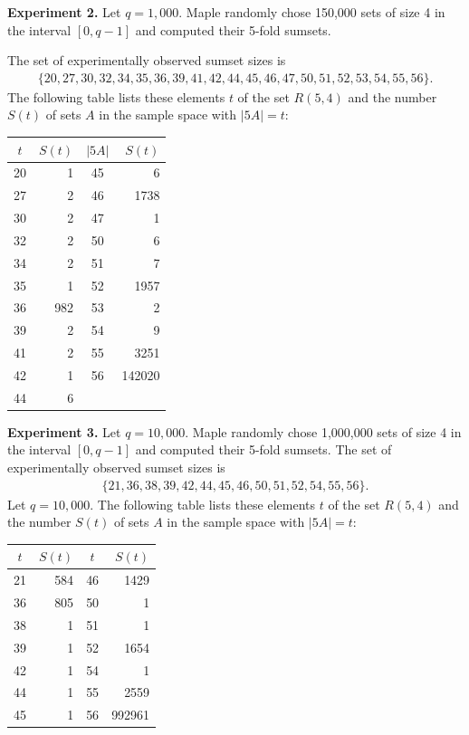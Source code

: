 \documentclass{amsart}
\begin{document}
\textbf{Experiment 2.}
Let $q = 1,000$. 
Maple randomly chose 150,000 sets of size 4 
in the interval $[0,q-1]$ and computed their 5-fold sumsets.  

 The set of  experimentally observed sumset sizes is 
\begin{align*}
\{20, 27, 30,  32, 34, 35,  36,    39, 41, 42, 
  44, 45, 46, 47,   50, 51, 52, 53, 54, 55, 56\}. 
\end{align*}
The following table lists these elements $t$ of the set $R(5,4)$ and the number $S(t)$ of sets $A$  in the sample space with $|5A|= t$: \\

\begin{center}
\begin{tabular}{cr|cr}
$t$ & $S(t)$  & $|5A|$ & $S(t)$   \\ \hline
20 & 1 & 45 & 6 \\  
27 & 2 & 46 & 1738   \\                      
30 & 2  & 47& 1  \\
32& 2 &   50 & 6 \\
34& 2 &     51& 7   \\
35 & 1 &    52& 1957   \\
36& 982 &   53 & 2     \\
39& 2  & 54& 9  \\
41& 2 &  55 & 3251 \\
42 & 1 & 56& 142020 \\
44& 6 &    &  
\end{tabular}
\end{center}

 
 \textbf{Experiment 3.}
Let $q = 10,000$. 
Maple randomly chose 1,000,000 sets of size 4 
in the interval  $[0,q-1]$  and computed their 5-fold sumsets.  
 The set of  experimentally observed sumset sizes is  
\begin{align*}
\{21,36, 38, 39, 42, 44, 45, 46, 50, 51, 52, 54,  55, 56\}. 
\end{align*}
Let $q = 10,000$. 
The following table lists these elements $t$ of the set $R(5,4)$ 
and the number $S(t)$ of sets $A$  in the sample space with $|5A|= t$: \\

\begin{center}
\begin{tabular}{cr|cr}
$t$ & $S(t)$  & $t$ & $S(t)$ \\ \hline
21 & 584 & 46& 1429  \\
36 & 805 & 50 & 1 \\
38 & 1 &  51 & 1 \\
39 & 1 & 52 & 1654 \\
42 & 1 & 54 & 1 \\
44 &  1&  55 & 2559 \\
45 & 1 &  56 & 992961  
\end{tabular}
\end{center}
\end{document}
